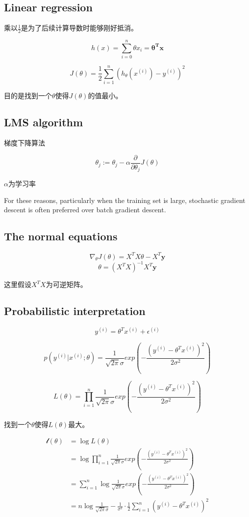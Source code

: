 \documentclass[letterpaper,11pt]{article}
\begin{document}
\begin{CJK}{UTF8}{gbsn}

\section{Linear regression}

乘以$\frac{1}{2}$是为了后续计算导数时能够刚好抵消。

$$h(x)=\sum_{i=0}^n{\theta}x_i=\bm{{\theta}^T}\bm{x}$$

$$J(\theta)=\frac{1}{2}\sum_{i=1}^n(h_{\theta}(x^{(i)})-y^{(i)})^2$$

目的是找到一个$\theta$使得$J(\theta)$的值最小。

\subsection{LMS algorithm}

梯度下降算法

$${\theta}_j:={\theta}_j-{\alpha}\frac{\partial}{{\partial}{\theta}_j}J(\theta)$$

$\alpha$为学习率

For these reasons, particularly when the training set is large, stochastic gradient descent is often preferred over batch gradient descent.

\subsection{The normal equations}

$$\nabla_{\theta}J(\theta)=X^TX{\theta}-X^T\bm{y}$$
$$\theta=(X^TX)^{-1}X^T\bm{y}$$

这里假设$X^TX$为可逆矩阵。

\subsection{Probabilistic interpretation}

$$y^{(i)}=\theta^Tx^{(i)}+\epsilon^{(i)}$$

$$p(y^{(i)}|x^{(i)};\theta)=\frac{1}{\sqrt{2\pi}\sigma}exp(-\frac{(y^{(i)}-\theta^Tx^{(i)})^2}{2\sigma^2})$$

$$L(\theta)=\prod_{i=1}^n{\frac{1}{\sqrt{2\pi}\sigma}exp(-\frac{(y^{(i)}-\theta^Tx^{(i)})^2}{2\sigma^2})}$$

找到一个$\theta$使得$L(\theta)$最大。

\begin{align*}
\mathcal{l}(\theta)&=\log L(\theta) \\
  &=\log \prod_{i=1}^n{\frac{1}{\sqrt{2\pi}\sigma}exp(-\frac{(y^{(i)}-\theta^Tx^{(i)})^2}{2\sigma^2})} \\
  &=\sum_{i=1}^n \log {\frac{1}{\sqrt{2\pi}\sigma}exp(-\frac{(y^{(i)}-\theta^Tx^{(i)})^2}{2\sigma^2})} \\
  &=n \log \frac{1}{\sqrt{2\pi}\sigma} - \frac{1}{\sigma^2} \cdot \frac{1}{2} \sum_{i=1}^n(y^{(i)} - \theta^T x^{(i)})^2
\end{align*}


\end{CJK}
\end{document}
